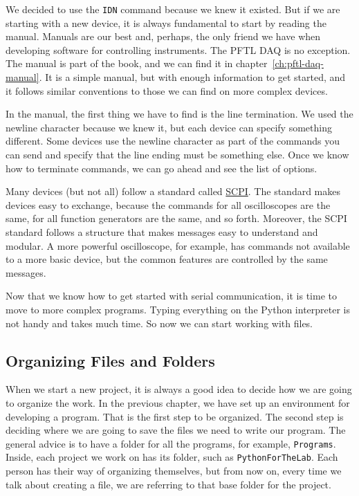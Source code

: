 We decided to use the \texttt{IDN} command because we knew it existed. But if we are starting with a new device, it is always fundamental to start by reading the manual. Manuals are our best and, perhaps, the only friend we have when developing software for controlling instruments. The {PFTL DAQ} is no exception. The manual is part of the book, and we can find it in chapter~\ref{ch:pftl-daq-manual}. It is a simple manual, but with enough information to get started, and it follows similar conventions to those we can find on more complex devices.

In the manual, the first thing we have to find is the line termination. We used the newline character because we knew it, but each device can specify something different. Some devices use the newline character as part of the commands you can send and specify that the line ending must be something else. Once we know how to terminate commands, we can go ahead and see the list of options.

Many devices (but not all) follow a standard called \href{https://en.wikipedia.org/wiki/Standard_Commands_for_Programmable_Instruments}{SCPI}. The standard makes devices easy to exchange, because the commands for all oscilloscopes are the same, for all function generators are the same, and so forth. Moreover, the SCPI standard follows a structure that makes messages easy to understand and modular. A more powerful oscilloscope, for example, has commands not available to a more basic device, but the common features are controlled by the same messages.

Now that we know how to get started with serial communication, it is time to move to more complex programs. Typing everything on the Python interpreter is not handy and takes much time. So now we can start working with files.

\subsection{Organizing Files and Folders}\label{subsec:organizing-files-and-folders}
When we start a new project, it is always a good idea to decide how we are going to organize the work. In the previous chapter, we have set up an environment for developing a program. That is the first step to be organized. The second step is deciding where we are going to save the files we need to write our program. The general advice is to have a folder for all the programs, for example, \texttt{Programs}. Inside, each project we work on has its folder, such as \texttt{PythonForTheLab}. Each person has their way of organizing themselves, but from now on, every time we talk about creating a file, we are referring to that base folder for the project.

